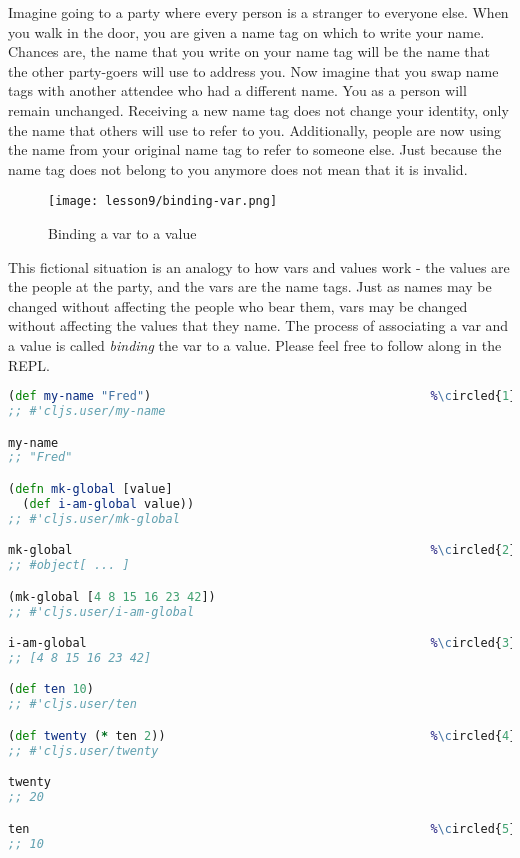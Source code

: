 \documentclass[10pt,twoside,openright]{memoir}
\newcommand*\circled[1]{\tikz[baseline=(char.base)]{
            \node[shape=circle,draw,inner sep=1pt] (char) {#1};}}
\begin{document}
Imagine going to a party where every person is a stranger to everyone
else. When you walk in the door, you are given a name tag on which to
write your name. Chances are, the name that you write on your name tag
will be the name that the other party-goers will use to address you. Now
imagine that you swap name tags with another attendee who had a
different name. You as a person will remain unchanged. Receiving a new
name tag does not change your identity, only the name that others will
use to refer to you. Additionally, people are now using the name from
your original name tag to refer to someone else. Just because the name
tag does not belong to you anymore does not mean that it is invalid.

\begin{figure}[H]
\caption{Binding a var to a value}
\centering
\texttt{[image: lesson9/binding-var.png]}
\end{figure}

This fictional situation is an analogy to how vars and values work - the
values are the people at the party, and the vars are the name tags. Just
as names may be changed without affecting the people who bear them, vars
may be changed without affecting the values that they name. The process
of associating a var and a value is called \emph{binding} the var to a
value. Please feel free to follow along in the REPL.

\begin{lstlisting}[language=Clojure, caption={Defining vars}]
(def my-name "Fred")                                       %\circled{1}%
;; #'cljs.user/my-name

my-name
;; "Fred"

(defn mk-global [value]
  (def i-am-global value))
;; #'cljs.user/mk-global

mk-global                                                  %\circled{2}%
;; #object[ ... ]

(mk-global [4 8 15 16 23 42])
;; #'cljs.user/i-am-global

i-am-global                                                %\circled{3}%
;; [4 8 15 16 23 42]

(def ten 10)
;; #'cljs.user/ten

(def twenty (* ten 2))                                     %\circled{4}%
;; #'cljs.user/twenty

twenty
;; 20

ten                                                        %\circled{5}%
;; 10
\end{lstlisting}
\end{document}
